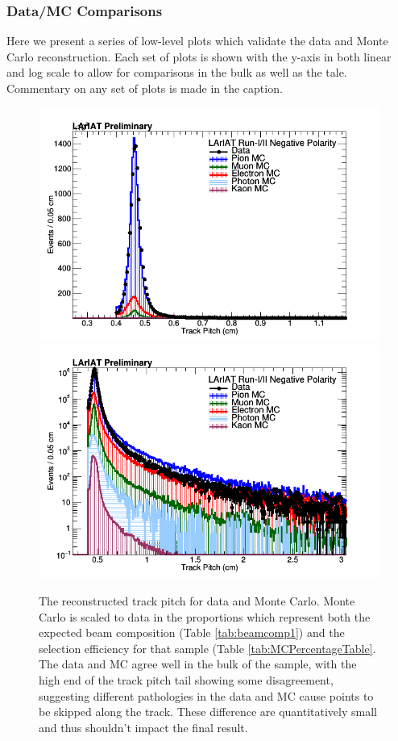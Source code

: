 \newpage
\subsubsection{Data/MC Comparisons} \label{sec:DataMCCompare}

Here we present a series of low-level plots which validate the data and Monte Carlo reconstruction. Each set of plots is shown with the y-axis in both linear and log scale to allow for comparisons in the bulk as well as the tale. Commentary on any set of plots is made in the caption.

\begin{figure}[h!]
\centering
\includegraphics[scale=0.33]{./images/TrackPitch.png}
\includegraphics[scale=0.33]{./images/TrackPitchLog.png}
\caption{The reconstructed track pitch for data and Monte Carlo. Monte Carlo is scaled to data in the proportions which represent both the expected beam composition (Table \ref{tab:beamcomp1}) and the selection efficiency for that sample (Table \ref{tab:MCPercentageTable}. The data and MC agree well in the bulk of the sample, with the high end of the track pitch tail showing some disagreement, suggesting different pathologies in the data and MC cause points to be skipped along the track. These difference are quantitatively small and thus shouldn't impact the final result. }
\label{fig:DataMCTrackPitch}
\end{figure}

